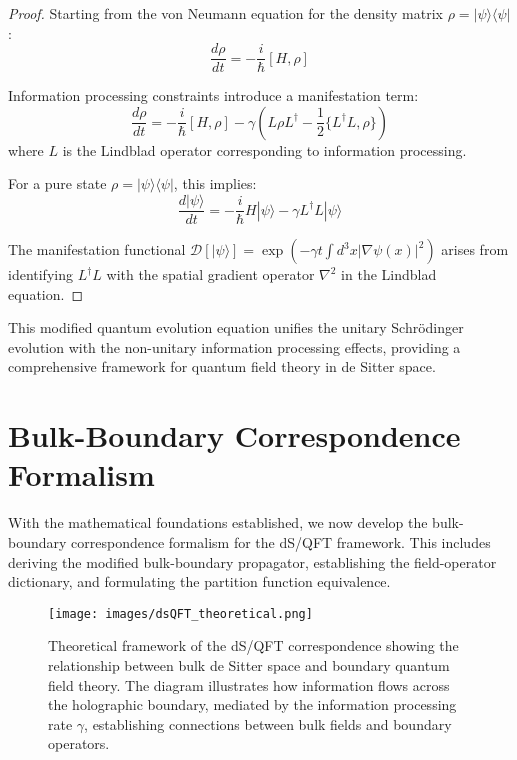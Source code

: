 \documentclass[11pt,english,twoside]{article}
\theoremstyle{plain}
\theoremstyle{definition}
\theoremstyle{remark}
\newcommand{\D}{{\mathcal{D}}}
\newcommand{\gammaR}{\gamma}
\begin{document}
\begin{proof}
Starting from the von Neumann equation for the density matrix $\rho = |\psi\rangle\langle\psi|$:
\begin{equation}
\frac{d\rho}{dt} = -\frac{i}{\hbar}[H,\rho]
\end{equation}

Information processing constraints introduce a manifestation term:
\begin{equation}
\frac{d\rho}{dt} = -\frac{i}{\hbar}[H,\rho] - \gammaR (L\rho L^\dagger - \frac{1}{2}\{L^\dagger L, \rho\})
\end{equation}
where $L$ is the Lindblad operator corresponding to information processing.

For a pure state $\rho = |\psi\rangle\langle\psi|$, this implies:
\begin{equation}
\frac{d|\psi\rangle}{dt} = -\frac{i}{\hbar}H|\psi\rangle - \gammaR L^\dagger L|\psi\rangle
\end{equation}

The manifestation functional $\D[|\psi\rangle] = \exp(-\gammaR t\int d^3x |\nabla\psi(x)|^2)$ arises from identifying $L^\dagger L$ with the spatial gradient operator $\nabla^2$ in the Lindblad equation.
\end{proof}

This modified quantum evolution equation unifies the unitary Schrödinger evolution with the non-unitary information processing effects, providing a comprehensive framework for quantum field theory in de Sitter space.

\section{Bulk-Boundary Correspondence Formalism}
\label{sec:bulk_boundary}

With the mathematical foundations established, we now develop the bulk-boundary correspondence formalism for the dS/QFT framework. This includes deriving the modified bulk-boundary propagator, establishing the field-operator dictionary, and formulating the partition function equivalence.

\begin{figure}[H]
\texttt{[image: images/dsQFT\_theoretical.png]}
\caption{Theoretical framework of the dS/QFT correspondence showing the relationship between bulk de Sitter space and boundary quantum field theory. The diagram illustrates how information flows across the holographic boundary, mediated by the information processing rate $\gammaR$, establishing connections between bulk fields and boundary operators.}
\label{fig:dsqft_theoretical}
\end{figure}
\end{document}
